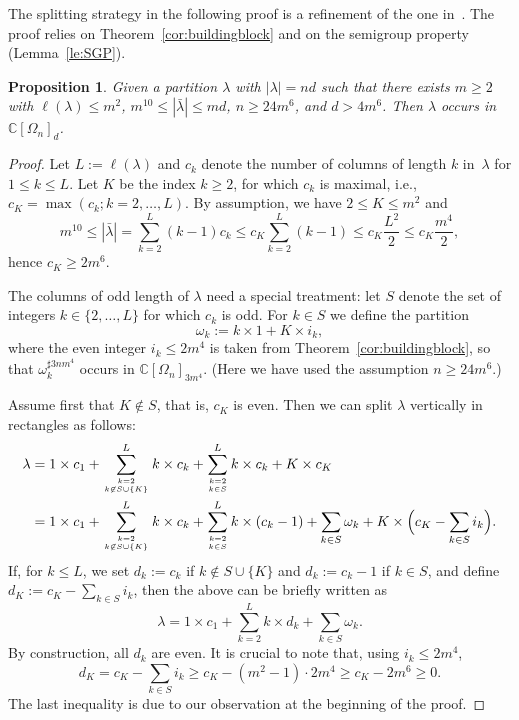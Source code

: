 \documentclass[11pt]{amsart}
\newcommand{\Det}{\Omega}
\def\la{\lambda}
\newcommand{\IC}{\ensuremath{\mathbb{C}}}
\numberwithin{equation}{section}
\newtheorem{proposition}[theorem]{Proposition}
\begin{document}
The splitting strategy in the following proof is a 
refinement of the one in~\cite{ik-panova:15}. 
The proof relies on Theorem~\ref{cor:buildingblock}
and on the semigroup property (Lemma~\ref{le:SGP}).

\begin{proposition}\label{thm:newoccurrence}
Given a partition $\la$ with $|\la|=nd$ 
such that there exists $m \geq 2$ with 
$\ell(\la)\leq m^2$, $m^{10} \leq |\bar\la|\leq md$, $n\geq 24m^6$, and $d>4m^6$. 
Then $\la$ occurs in $\IC[\Det_n]_d$.
\end{proposition}

\begin{proof}
Let $L:=\ell(\lambda)$ and $c_k$ denote the number of columns of length $k$ in~$\la$
for $1\le k \le L$. Let $K$ be the index $k \geq 2$, for which $c_k$ is maximal, 
i.e., $c_K = \max(c_k; k=2,\ldots, L)$. 
By assumption, we have $2 \leq K \leq m^2$ and 
$$
 m^{10} \le |\bar{\la}| = \sum_{k=2}^L (k-1) c_k \le c_K \sum_{k=2}^L (k-1) 
  \le c_K \frac{L^2}{2} \le c_K \frac{m^4}{2} ,
$$
hence $c_K \ge 2m^6$. 

The columns of odd length of $\la$ need a special treatment: 
let $S$ denote the set of integers $k\in\{2,\ldots,L\}$ for which $c_k$ is odd.
For $k \in S$ we define the partition 
\[
\omega_k := k \times 1 + K \times i_k , 
\]
where the even integer $i_k \leq 2m^4$ is taken from Theorem~\ref{cor:buildingblock}, 
so that $\omega_k^{\sharp 3nm^4}$ occurs in $\IC[\Det_n]_{3m^4}$.
(Here we have used the assumption $n\geq24m^6$.) 

Assume first that $K\not\in S$, that is, $c_K$ is even. 
Then we can split $\la$  vertically in rectangles as follows:
\begin{equation*}
\begin{split}
 \la &= 1 \times c_1 + \sum_{k=2 \atop k\not\in S \cup \{K\} }^{L} k \times c_k 
      + \sum_{k=2 \atop k\in S}^{L} k \times c_k + K \times c_K \\
   & = 1 \times c_1 + \sum_{k=2 \atop k\not\in S \cup \{K\} }^{L} k \times c_k 
      + \sum_{k=2 \atop k\in S}^{L} k \times (c_k-1)   + \sum_{k\in S} \omega_k 
        + K \times \Big(c_K - \sum_{k \in S} i_k \Big) .
\end{split}
\end{equation*}
If, for $k\leq L$, we set
$d_k := c_k$ if $k\not\in S \cup \{K\}$ and $d_k := c_k -1 $ if $k\in S$, and 
define 
$d_K:=c_K - \sum_{k \in S} i_k$, 
then the above can be briefly written as 
\begin{equation}\label{eq:SPLIT}
 \la = 1 \times c_1 + \sum_{k=2}^{L} k \times d_k + \sum_{k\in S} \omega_k .
\end{equation}
By construction, all $d_k$ are even. 
It is crucial to note that, using $i_k \le 2m^4$, 
$$
d_{K} = c_{K}-\sum_{k \in S}i_k \geq c_{K}-(m^2-1)\cdot 2m^4  \geq c_{K} - 2 m^6  \ge 0.
$$
The last inequality is due to our observation at the beginning of the proof. 


\end{proof}
\end{document}
